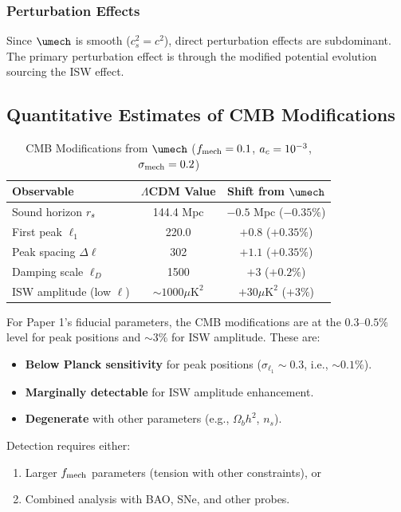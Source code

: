 \subsubsection{Perturbation Effects}

Since $\umech$ is smooth ($c_s^2 = c^2$), direct perturbation effects are subdominant. The primary perturbation effect is through the modified potential evolution sourcing the ISW effect.

\subsection{Quantitative Estimates of CMB Modifications}
\label{sec:cmb_quantitative}

\begin{table}[H]
\centering
\caption{CMB Modifications from $\umech$ ($f_{\mathrm{mech}} = 0.1$, $a_c = 10^{-3}$, $\sigma_{\mathrm{mech}} = 0.2$)}
\label{tab:cmb_modifications}
\begin{tabular}{@{}lcc@{}}
\toprule
\textbf{Observable} & \textbf{$\Lambda$CDM Value} & \textbf{Shift from $\umech$} \\
\midrule
Sound horizon $r_s$ & 144.4 Mpc & $-0.5$ Mpc ($-0.35\%$) \\
First peak $\ell_1$ & 220.0 & $+0.8$ ($+0.35\%$) \\
Peak spacing $\Delta\ell$ & 302 & $+1.1$ ($+0.35\%$) \\
Damping scale $\ell_D$ & 1500 & $+3$ ($+0.2\%$) \\
ISW amplitude (low $\ell$) & $\sim 1000 \mu\text{K}^2$ & $+30 \mu\text{K}^2$ ($+3\%$) \\
\bottomrule
\end{tabular}
\end{table}

\begin{proposition}
\label{prop:detectability}
For Paper 1's fiducial parameters, the CMB modifications are at the $0.3$--$0.5\%$ level for peak positions and $\sim 3\%$ for ISW amplitude. These are:
\begin{itemize}
\item \textbf{Below Planck sensitivity} for peak positions ($\sigma_{\ell_1} \sim 0.3$, i.e., $\sim 0.1\%$).
\item \textbf{Marginally detectable} for ISW amplitude enhancement.
\item \textbf{Degenerate} with other parameters (e.g., $\Omega_b h^2$, $n_s$).
\end{itemize}

Detection requires either:
\begin{enumerate}
\item Larger $f_{\mathrm{mech}}$ parameters (tension with other constraints), or
\item Combined analysis with BAO, SNe, and other probes.
\end{enumerate}
\end{proposition}

